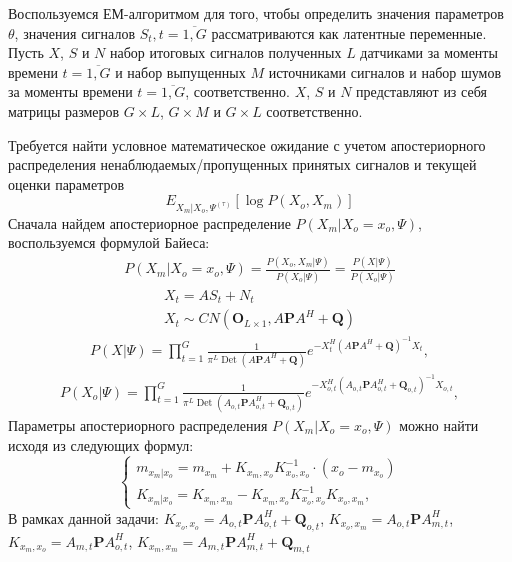 \documentclass[11pt]{article}
\DeclareMathOperator{\Det}{Det}
\begin{document}
Воспользуемся ЕМ-алгоритмом для того, чтобы определить значения параметров $\theta$, значения сигналов $S_t, t=\overline{1,G}$ рассматриваются как латентные переменные. 
Пусть $X$, $S$ и $N$ набор итоговых сигналов полученных $L$ датчиками за моменты времени $t=\overline{1,G}$ и набор выпущенных $M$ источниками сигналов и набор шумов за моменты времени $t=\overline{1,G}$, соответственно. $X$, $S$ и $N$ представляют из себя матрицы размеров $G \times L$, $G \times M$ и $G \times L$ соответственно.
\begin{center}
\fontsize{16}{20}\selectfont {}
\end{center}
Требуется найти условное математическое ожидание с учетом апостериорного распределения ненаблюдаемых/пропущенных принятых сигналов и текущей оценки параметров
\begin{equation}
 E_{X_m|X_o, \Psi^{(\tau)}}[\log P(X_o, X_m)]
\end{equation}
Сначала найдем апостериорное распределение $P(X_m|X_o=x_o,\Psi)$, воспользуемся формулой Байеса:
\begin{gather}
P(X_m|X_o=x_o,\Psi) = \frac{P(X_o, X_m|\Psi)}{P(X_o|\Psi)} = \frac{P(X|\Psi)}{P(X_o|\Psi)}
\end{gather}
\begin{gather*}
X_t = AS_t + N_t \\
X_t \sim CN(\mathbf{O}_{L \times 1}, A\mathbf{P}A^H + \mathbf{Q})
\end{gather*}
\begin{gather}
P(X|\Psi) = \prod_{t=1}^G \frac{1}{\pi^L \Det(A\mathbf{P}A^H + \mathbf{Q})}e^{-X_t^H (A\mathbf{P}A^H + \mathbf{Q})^{-1}X_t},
\end{gather}
\begin{gather}
P(X_o|\Psi) = \prod_{t=1}^G \frac{1}{\pi^L \Det(A_{o,t}\mathbf{P}A_{o,t}^H + \mathbf{Q}_{o,t})}e^{-X_{o,t}^H (A_{o,t}\mathbf{P}A_{o,t}^H + \mathbf{Q}_{o,t})^{-1}X_{o,t}},
\end{gather}
Параметры апостериорного распределения $P(X_m|X_o=x_o,\Psi)$ можно найти исходя из следующих формул:
\begin{equation}
\left\{ \begin{gathered} 
m_{x_m|x_o} = m_{x_m} + K_{x_m,x_o}K_{x_o,x_o}^{-1}\cdot(x_o-m_{x_o}) \\
K_{x_m|x_o} = K_{x_m,x_m}-K_{x_m,x_o}K_{x_o,x_o}^{-1}K_{x_o,x_m},
\end{gathered} \right.
\end{equation}
В рамках данной задачи: $K_{x_o,x_o} = A_{o,t}\mathbf{P} A_{o,t}^H + \mathbf{Q}_{o,t}$, $K_{x_o,x_m} = A_{o,t}\mathbf{P} A_{m,t}^H$, $K_{x_m,x_o} = A_{m,t}\mathbf{P} A_{o,t}^H$, $K_{x_m,x_m} = A_{m,t}\mathbf{P} A_{m,t}^H + \mathbf{Q}_{m,t}$
\end{document}
